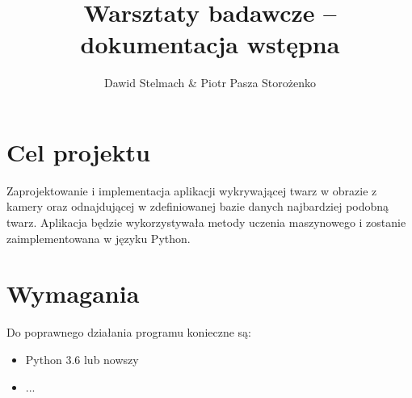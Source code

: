 \documentclass[a4paper]{mwart}
\author{Dawid Stelmach \& Piotr Pasza Storożenko}
\title{Warsztaty badawcze -- dokumentacja wstępna}
\begin{document}
\maketitle

\section{Cel projektu}

Zaprojektowanie i implementacja aplikacji wykrywającej twarz w obrazie z kamery oraz odnajdującej w zdefiniowanej bazie danych najbardziej podobną twarz. Aplikacja będzie wykorzystywała metody uczenia maszynowego i zostanie zaimplementowana w języku Python.

\section{Wymagania}

Do poprawnego działania programu konieczne są:

\begin{itemize}
	\item Python 3.6 lub nowszy
	\item ...
\end{itemize}
\end{document}
